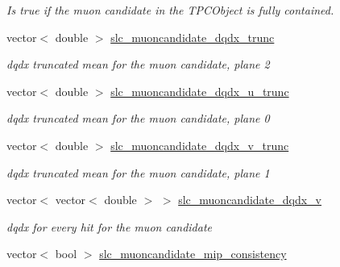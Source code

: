 \begin{DoxyCompactItemize}
\begin{DoxyCompactList}\small\item\em Is true if the muon candidate in the T\-P\-C\-Object is fully contained. \end{DoxyCompactList}\item 
\hypertarget{classUBXSecEvent_aec6e2338e43e8cd376f3eb7f9785b744}{vector$<$ double $>$ \hyperlink{classUBXSecEvent_aec6e2338e43e8cd376f3eb7f9785b744}{slc\-\_\-muoncandidate\-\_\-dqdx\-\_\-trunc}}\label{classUBXSecEvent_aec6e2338e43e8cd376f3eb7f9785b744}

\begin{DoxyCompactList}\small\item\em dqdx truncated mean for the muon candidate, plane 2 \end{DoxyCompactList}\item 
\hypertarget{classUBXSecEvent_adcc89b6ddd486fd6c1eb19c8fb710a04}{vector$<$ double $>$ \hyperlink{classUBXSecEvent_adcc89b6ddd486fd6c1eb19c8fb710a04}{slc\-\_\-muoncandidate\-\_\-dqdx\-\_\-u\-\_\-trunc}}\label{classUBXSecEvent_adcc89b6ddd486fd6c1eb19c8fb710a04}

\begin{DoxyCompactList}\small\item\em dqdx truncated mean for the muon candidate, plane 0 \end{DoxyCompactList}\item 
\hypertarget{classUBXSecEvent_a9640dedc7adeef5eb840fc49b1ce1a33}{vector$<$ double $>$ \hyperlink{classUBXSecEvent_a9640dedc7adeef5eb840fc49b1ce1a33}{slc\-\_\-muoncandidate\-\_\-dqdx\-\_\-v\-\_\-trunc}}\label{classUBXSecEvent_a9640dedc7adeef5eb840fc49b1ce1a33}

\begin{DoxyCompactList}\small\item\em dqdx truncated mean for the muon candidate, plane 1 \end{DoxyCompactList}\item 
\hypertarget{classUBXSecEvent_ad66a437d850fb4a5f8fd39bffcb540ae}{vector$<$ vector$<$ double $>$ $>$ \hyperlink{classUBXSecEvent_ad66a437d850fb4a5f8fd39bffcb540ae}{slc\-\_\-muoncandidate\-\_\-dqdx\-\_\-v}}\label{classUBXSecEvent_ad66a437d850fb4a5f8fd39bffcb540ae}

\begin{DoxyCompactList}\small\item\em dqdx for every hit for the muon candidate \end{DoxyCompactList}\item 
\hypertarget{classUBXSecEvent_a535d450659bbc041a675b3c602650ce5}{vector$<$ bool $>$ \hyperlink{classUBXSecEvent_a535d450659bbc041a675b3c602650ce5}{slc\-\_\-muoncandidate\-\_\-mip\-\_\-consistency}}\label{classUBXSecEvent_a535d450659bbc041a675b3c602650ce5}


\end{DoxyCompactItemize}
